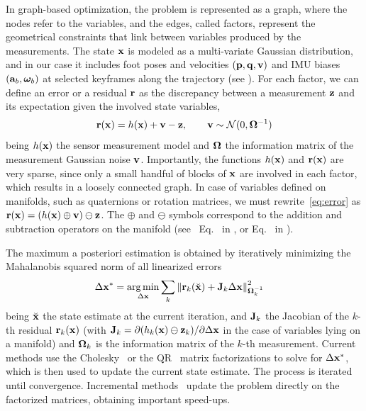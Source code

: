 In graph-based optimization, the problem is represented as a graph, where the nodes refer to the variables, and the edges, called factors, represent the geometrical constraints that link between variables produced by the measurements.
%
The state ${\bf x}$ is modeled as a multi-variate Gaussian distribution, and in our case it includes foot poses and velocities $({\bf p},{\bf q},{\bf v})$ and IMU biases $({\bf a}_b,{{\bm \omega}}_b)$ at selected keyframes along the trajectory (see ).
%
For each factor, we can define an error or a residual ${\bf r}$ as the discrepancy between a measurement ${\bf z}$ and its expectation given the involved state variables,
%
\begin{equation}
    {\bf r}({\bf x}) = h({\bf x}) + {\bf v} - {\bf z}, \qquad {\bf v} \sim \mathcal {\mathcal{N}} (0, {\bm \Omega}^{-1})\label{eq:error}
\end{equation}
%
being $h({\bf x})$ the sensor measurement model and ${\bm \Omega}$ the information matrix of the measurement Gaussian noise ${\bf v}$.
Importantly, the functions $h({\bf x})$ and ${\bf r}({\bf x})$ are very sparse, since only a small handful of blocks of ${\bf x}$ are involved in each factor, which results in a loosely connected graph.
In case of variables defined on manifolds, such as quaternions or rotation matrices, we must rewrite~\eqref{eq:error} as \mbox{${\bf r}({\bf x}) = (h({\bf x}) \oplus {\bf v}) \ominus {\bf z}$}.
The $\oplus$ and $\ominus$ symbols correspond to the addition and subtraction operators on the manifold
(see \eg~Eq.~ in , or Eq.~ in ).

The maximum a posteriori estimation is obtained by iteratively minimizing the Mahalanobis squared norm of all linearized errors
%
\begin{align}
  \Delta {\bf x}^* &= \operatorname*{arg\,min}_{\Delta {\bf x}} \sum_k {\left\| {\bf r}_k(\breve{{\bf x}}) + {\bf J}_k \Delta {\bf x} \right\|}_{{\bm \Omega}_k^{-1}}^2 \label{eq:LeastSquares}
\end{align}
%
being $\breve{{\bf x}}$ the state estimate at the current iteration, and ${\bf J}_k$ the Jacobian of the $k$-th residual ${\bf r}_k({\bf x})$ (with \mbox{${\bf J}_k = \partial (h_k({\bf x})\ominus{\bf z}_k)/\partial \Delta {\bf x}$} in the case of variables lying on a manifold) and ${\bm \Omega}_k$ is the information matrix of the $k$-th measurement.
%
Current methods use the Cholesky~\cite{Kummerle_icra11,ila_ijrr17} or the QR~\cite{Dellaert_ijrr06,Kaess_ijrr11} matrix factorizations to solve for $\Delta{\bf x}^*$, which is then used to update the current state estimate. 
The process is iterated until convergence.
%
Incremental methods~\cite{ila_ijrr17,Kaess_ijrr11} update the problem directly on the factorized matrices, obtaining important speed-ups.



